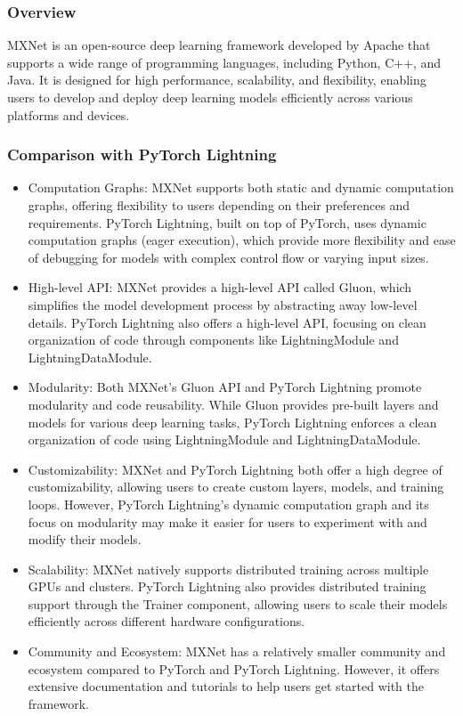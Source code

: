 \documentclass[12pt]{article}
\begin{document}
\subsubsection{Overview}

MXNet is an open-source deep learning framework developed by Apache that supports a wide range of programming languages, including Python, C++, and Java. It is designed for high performance, scalability, and flexibility, enabling users to develop and deploy deep learning models efficiently across various platforms and devices.

\subsubsection{Comparison with PyTorch Lightning}

\begin{itemize}
    \item Computation Graphs: MXNet supports both static and dynamic computation graphs, offering flexibility to users depending on their preferences and requirements. PyTorch Lightning, built on top of PyTorch, uses dynamic computation graphs (eager execution), which provide more flexibility and ease of debugging for models with complex control flow or varying input sizes.
    \item High-level API: MXNet provides a high-level API called Gluon, which simplifies the model development process by abstracting away low-level details. PyTorch Lightning also offers a high-level API, focusing on clean organization of code through components like LightningModule and LightningDataModule.
    \item Modularity: Both MXNet's Gluon API and PyTorch Lightning promote modularity and code reusability. While Gluon provides pre-built layers and models for various deep learning tasks, PyTorch Lightning enforces a clean organization of code using LightningModule and LightningDataModule.
    \item Customizability: MXNet and PyTorch Lightning both offer a high degree of customizability, allowing users to create custom layers, models, and training loops. However, PyTorch Lightning's dynamic computation graph and its focus on modularity may make it easier for users to experiment with and modify their models.
    \item Scalability: MXNet natively supports distributed training across multiple GPUs and clusters. PyTorch Lightning also provides distributed training support through the Trainer component, allowing users to scale their models efficiently across different hardware configurations.
    \item Community and Ecosystem: MXNet has a relatively smaller community and ecosystem compared to PyTorch and PyTorch Lightning. However, it offers extensive documentation and tutorials to help users get started with the framework.
\end{itemize}
\end{document}
